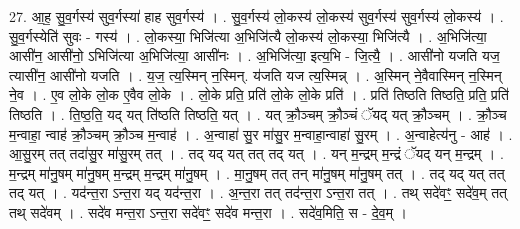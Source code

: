 \documentclass[17pt]{extarticle}
\begin{document}
27. आ॒ह॒ सु॒व॒र्गस्य॑ सुव॒र्गस्या॑ हाह सुव॒र्गस्य॑ । . सु॒व॒र्गस्य॑ लो॒कस्य॑ लो॒कस्य॑ सुव॒र्गस्य॑ सुव॒र्गस्य॑ लो॒कस्य॑ । . सु॒व॒र्गस्येति॑ सुवः - गस्य॑ । . लो॒कस्या॒ भिजि॑त्या अ॒भिजि॑त्यै लो॒कस्य॑ लो॒कस्या॒ भिजि॑त्यै । . अ॒भिजि॑त्या॒ आसी॑न॒ आसी॑नो॒ ऽभिजि॑त्या अ॒भिजि॑त्या॒ आसी॑नः । . अ॒भिजि॑त्या॒ इत्य॒भि - जि॒त्यै॒ । . आसी॑नो यजति यज॒ त्यासी॑न॒ आसी॑नो यजति । . य॒ज॒ त्य॒स्मिन् न॒स्मिन्. य॑जति यज त्य॒स्मिन्न् । . अ॒स्मिन् ने॒वैवास्मिन् न॒स्मिन् ने॒व । . ए॒व लो॒के लो॒क ए॒वैव लो॒के । . लो॒के प्रति॒ प्रति॑ लो॒के लो॒के प्रति॑ । . प्रति॑ तिष्ठति तिष्ठति॒ प्रति॒ प्रति॑ तिष्ठति । . ति॒ष्ठ॒ति॒ यद् यत् ति॑ष्ठति तिष्ठति॒ यत् । . यत् क्रौ॒ञ्चम् क्रौ॒ञ्चं ॅयद् यत् क्रौ॒ञ्चम् । . क्रौ॒ञ्च म॒न्वाहा॒ न्वाह॑ क्रौ॒ञ्चम् क्रौ॒ञ्च म॒न्वाह॑ । . अ॒न्वाहा॑ सु॒र मा॑सु॒र म॒न्वाहा॒न्वाहा॑ सु॒रम् । . अ॒न्वाहेत्य॑नु - आह॑ । . आ॒सु॒रम् तत् तदा॑सु॒र मा॑सु॒रम् तत् । . तद् यद् यत् तत् तद् यत् । . यन् म॒न्द्रम् म॒न्द्रं ॅयद् यन् म॒न्द्रम् । . म॒न्द्रम् मा॑नु॒षम् मा॑नु॒षम् म॒न्द्रम् म॒न्द्रम् मा॑नु॒षम् । . मा॒नु॒षम् तत् तन् मा॑नु॒षम् मा॑नु॒षम् तत् । . तद् यद् यत् तत् तद् यत् । . यद॑न्त॒रा ऽन्त॒रा यद् यद॑न्त॒रा । . अ॒न्त॒रा तत् तद॑न्त॒रा ऽन्त॒रा तत् । . तथ् सदे॑वꣳ॒॒ सदे॑व॒म् तत् तथ् सदे॑वम् । . सदे॑व मन्त॒रा ऽन्त॒रा सदे॑वꣳ॒॒ सदे॑व मन्त॒रा । . सदे॑व॒मिति॒ स - दे॒व॒म् । \newline
\end{document}
